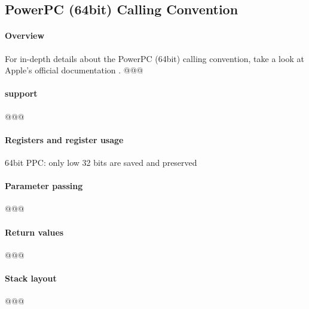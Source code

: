 %
%
%
%

\subsection{PowerPC (64bit) Calling Convention}



\paragraph{Overview}

For in-depth details about the PowerPC (64bit) calling convention, take a look
at Apple's official documentation \cite{ppcMacOSX}.
@@@


\paragraph{ support}

@@@


\paragraph{Registers and register usage}

64bit PPC: only low 32 bits are saved and preserved


\paragraph{Parameter passing}

@@@


\paragraph{Return values}

@@@


\paragraph{Stack layout}

@@@

